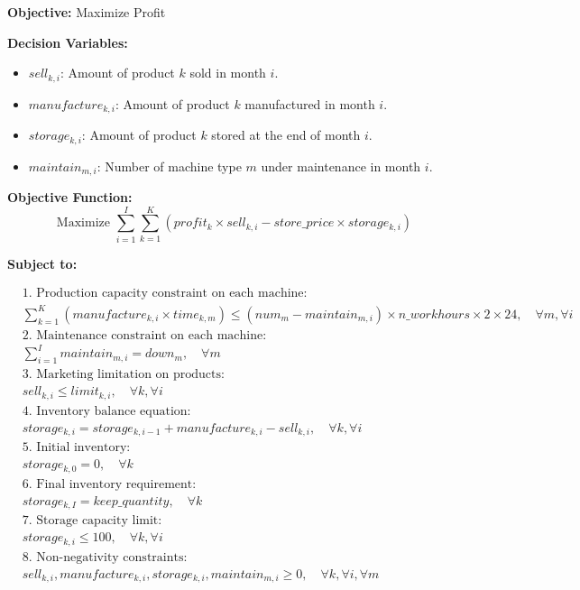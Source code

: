 \documentclass{article}
\begin{document}
\textbf{Objective:} Maximize Profit

\textbf{Decision Variables:}
\begin{itemize}
    \item $sell_{k, i}$: Amount of product $k$ sold in month $i$.
    \item $manufacture_{k, i}$: Amount of product $k$ manufactured in month $i$.
    \item $storage_{k, i}$: Amount of product $k$ stored at the end of month $i$.
    \item $maintain_{m, i}$: Number of machine type $m$ under maintenance in month $i$.
\end{itemize}

\textbf{Objective Function:}
\[
\text{Maximize } \sum_{i=1}^{I} \sum_{k=1}^{K} \left( profit_{k} \times sell_{k, i} - store\_price \times storage_{k, i} \right)
\]

\textbf{Subject to:}

\begin{align}
    & \text{1. Production capacity constraint on each machine:} \nonumber \\
    & \sum_{k=1}^{K} (manufacture_{k, i} \times time_{k, m}) \leq \left( num_{m} - maintain_{m, i} \right) \times n\_workhours \times 2 \times 24, \quad \forall m, \forall i \nonumber \\
    & \text{2. Maintenance constraint on each machine:} \nonumber \\
    & \sum_{i=1}^{I} maintain_{m, i} = down_{m}, \quad \forall m \nonumber \\
    & \text{3. Marketing limitation on products:} \nonumber \\
    & sell_{k, i} \leq limit_{k, i}, \quad \forall k, \forall i \nonumber \\
    & \text{4. Inventory balance equation:} \nonumber \\
    & storage_{k, i} = storage_{k, i-1} + manufacture_{k, i} - sell_{k, i}, \quad \forall k, \forall i \nonumber \\
    & \text{5. Initial inventory:} \nonumber \\
    & storage_{k, 0} = 0, \quad \forall k \nonumber \\
    & \text{6. Final inventory requirement:} \nonumber \\
    & storage_{k, I} = keep\_quantity, \quad \forall k \nonumber \\
    & \text{7. Storage capacity limit:} \nonumber \\
    & storage_{k, i} \leq 100, \quad \forall k, \forall i \nonumber \\
    & \text{8. Non-negativity constraints:} \nonumber \\
    & sell_{k, i}, manufacture_{k, i}, storage_{k, i}, maintain_{m, i} \geq 0, \quad \forall k, \forall i, \forall m \nonumber
\end{align}
\end{document}
